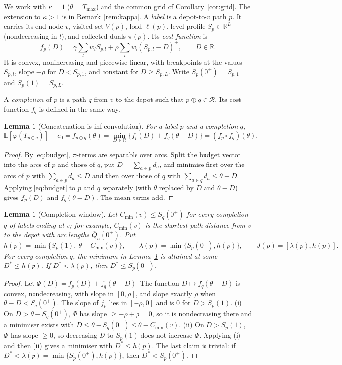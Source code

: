 \documentclass[11pt]{article}
\newtheorem{lemma}[theorem]{Lemma}
\theoremstyle{definition}
\newcommand{\R}{\mathbb{R}}
\newcommand{\Eu}{\overline{\mathbb{E}}}
\newcommand{\Qb}{\overline{Q}}
\newcommand{\pib}{\overline{\pi}}
\newcommand{\cR}{\mathcal{R}}
\newcommand{\pos}[1]{\left(#1\right)^{+}}
\begin{document}
We work with $\kappa=1$ ($\theta=T_{\max}$) and the common grid of Corollary~\ref{cor:grid}. The extension to $\kappa>1$ is in Remark~\ref{rem:kappa}. A \emph{label} is a depot-to-$v$ path $p$. It carries its end node $v$, visited set $V(p)$, load $\ell(p)$, level profile $S_p\in\R^L$ (nondecreasing in $l$), and collected duals $\pi(p)$. Its \emph{cost function} is
\[
f_p(D)=\gamma\sum_lw_lS_{p,l}+\rho\sum_lw_l\pos{S_{p,l}-D},\qquad D\in\R .
\]
It is convex, nonincreasing and piecewise linear, with breakpoints at the values $S_{p,l}$, slope $-\rho$ for $D<S_{p,1}$, and constant for $D\ge S_{p,L}$. Write $S_p(0^+)=S_{p,1}$ and $S_p(1)=S_{p,L}$.

A \emph{completion} of $p$ is a path $q$ from $v$ to the depot such that $p\oplus q\in\cR$. Its cost function $f_q$ is defined in the same way.

\begin{lemma}[Concatenation is inf-convolution]\label{lem:infconv}
For a label $p$ and a completion $q$,
\[
\Eu[\varphi(T_{p\oplus q})]-c_0=f_{p\oplus q}(\theta)=\min_{D\in\R}\big\{f_p(D)+f_q(\theta-D)\big\}=(f_p\,\square\,f_q)(\theta).
\]
\end{lemma}
\begin{proof}
By \eqref{eq:budget}, $\pib$-terms are separable over arcs. Split the budget vector into the arcs of $p$ and those of $q$, put $D=\sum_{a\in p}d_a$, and minimise first over the arcs of $p$ with $\sum_{a\in p}d_a\le D$ and then over those of $q$ with $\sum_{a\in q}d_a\le\theta-D$. Applying \eqref{eq:budget} to $p$ and $q$ separately (with $\theta$ replaced by $D$ and $\theta-D$) gives $f_p(D)$ and $f_q(\theta-D)$. The mean terms add.
\end{proof}

\begin{lemma}[Completion window]\label{lem:window}
Let $C_{\min}(v)\le S_q(0^+)$ for every completion $q$ of labels ending at $v$; for example, $C_{\min}(v)$ is the shortest-path distance from $v$ to the depot with arc lengths $\Qb_a(0^+)$. Put
\[
h(p)=\min\{S_p(1),\ \theta-C_{\min}(v)\},\qquad \lambda(p)=\min\{S_p(0^+),h(p)\},\qquad J(p)=[\lambda(p),h(p)].
\]
For every completion $q$, the minimum in Lemma~\ref{lem:infconv} is attained at some $D^*\le h(p)$. If $D^*<\lambda(p)$, then $D^*\le S_p(0^+)$.
\end{lemma}
\begin{proof}
Let $\Phi(D)=f_p(D)+f_q(\theta-D)$. The function $D\mapsto f_q(\theta-D)$ is convex, nondecreasing, with slope in $[0,\rho]$, and slope exactly $\rho$ when $\theta-D<S_q(0^+)$. The slope of $f_p$ lies in $[-\rho,0]$ and is $0$ for $D>S_p(1)$.
(i) On $D>\theta-S_q(0^+)$, $\Phi$ has slope $\ge-\rho+\rho=0$, so it is nondecreasing there and a minimiser exists with $D\le\theta-S_q(0^+)\le\theta-C_{\min}(v)$.
(ii) On $D>S_p(1)$, $\Phi$ has slope $\ge0$, so decreasing $D$ to $S_p(1)$ does not increase $\Phi$.
Applying (i) and then (ii) gives a minimiser with $D^*\le h(p)$. The last claim is trivial: if $D^*<\lambda(p)=\min\{S_p(0^+),h(p)\}$, then $D^*<S_p(0^+)$.
\end{proof}
\end{document}
